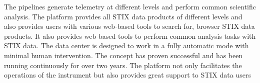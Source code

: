 \documentclass[referee]{aa} %
\begin{document}
   {The pipelines generate telemetry at different levels and perform common scientific analysis. 
 The platform provides 
 all STIX data products of different levels and also provides users 
 with various web-based tools to search for,  browser STIX data products. 
 It also provides web-based tools to perform common analysis tasks with STIX data. 
  The data center is designed to work in a 
 fully automatic mode with minimal human intervention. The concept has proven successful 
 and has been running continuously for over two years.
The platform not only facilitates the operations of the instrument but also provides great support to STIX data users }

   \maketitle

\end{document}
